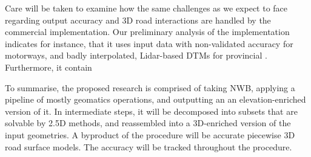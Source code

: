 Care will be taken to examine how the same challenges as we expect to face regarding output accuracy and 3D road interactions are handled by the commercial implementation. Our preliminary analysis of the implementation indicates for instance, that it uses input data with non-validated accuracy for motorways, and badly interpolated, Lidar-based DTMs for provincial . Furthermore, it contain

To summarise, the proposed research is comprised of taking NWB, applying a pipeline of mostly geomatics operations, and outputting an an elevation-enriched version of it. In intermediate steps, it will be decomposed into subsets that are solvable by 2.5D methods, and reassembled into a 3D-enriched version of the input geometries. A byproduct of the procedure will be accurate piecewise 3D road surface models. The accuracy will be tracked throughout the procedure.